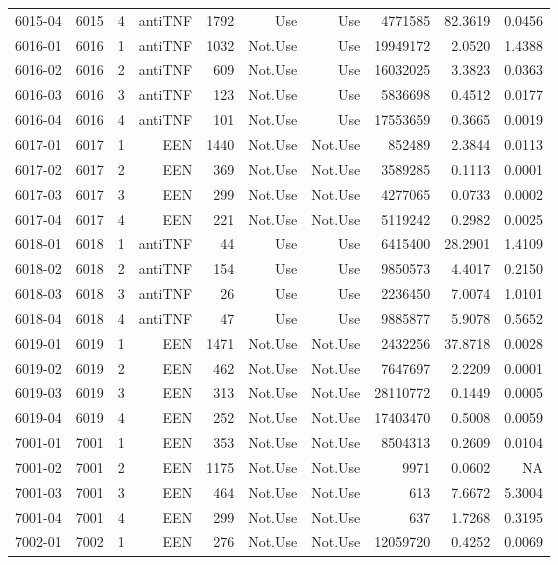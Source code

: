{\begin{longtable}{ | r | r | r | r | r | r | r | r | r | r | }
6015-04 & 6015 & 4 & antiTNF & 1792 & Use & Use & 4771585 & 82.3619 & 0.0456\\ 
6016-01 & 6016 & 1 & antiTNF & 1032 & Not.Use & Use & 19949172 & 2.0520 & 1.4388\\ 
6016-02 & 6016 & 2 & antiTNF & 609 & Not.Use & Use & 16032025 & 3.3823 & 0.0363\\ 
6016-03 & 6016 & 3 & antiTNF & 123 & Not.Use & Use & 5836698 & 0.4512 & 0.0177\\ 
6016-04 & 6016 & 4 & antiTNF & 101 & Not.Use & Use & 17553659 & 0.3665 & 0.0019\\ 
6017-01 & 6017 & 1 & EEN & 1440 & Not.Use & Not.Use & 852489 & 2.3844 & 0.0113\\ 
6017-02 & 6017 & 2 & EEN & 369 & Not.Use & Not.Use & 3589285 & 0.1113 & 0.0001\\ 
6017-03 & 6017 & 3 & EEN & 299 & Not.Use & Not.Use & 4277065 & 0.0733 & 0.0002\\ 
6017-04 & 6017 & 4 & EEN & 221 & Not.Use & Not.Use & 5119242 & 0.2982 & 0.0025\\ 
6018-01 & 6018 & 1 & antiTNF & 44 & Use & Use & 6415400 & 28.2901 & 1.4109\\ 
6018-02 & 6018 & 2 & antiTNF & 154 & Use & Use & 9850573 & 4.4017 & 0.2150\\ 
6018-03 & 6018 & 3 & antiTNF & 26 & Use & Use & 2236450 & 7.0074 & 1.0101\\ 
6018-04 & 6018 & 4 & antiTNF & 47 & Use & Use & 9885877 & 5.9078 & 0.5652\\ 
6019-01 & 6019 & 1 & EEN & 1471 & Not.Use & Not.Use & 2432256 & 37.8718 & 0.0028\\ 
6019-02 & 6019 & 2 & EEN & 462 & Not.Use & Not.Use & 7647697 & 2.2209 & 0.0001\\ 
6019-03 & 6019 & 3 & EEN & 313 & Not.Use & Not.Use & 28110772 & 0.1449 & 0.0005\\ 
6019-04 & 6019 & 4 & EEN & 252 & Not.Use & Not.Use & 17403470 & 0.5008 & 0.0059\\ 
7001-01 & 7001 & 1 & EEN & 353 & Not.Use & Not.Use & 8504313 & 0.2609 & 0.0104\\ 
7001-02 & 7001 & 2 & EEN & 1175 & Not.Use & Not.Use & 9971 & 0.0602 & NA\\ 
7001-03 & 7001 & 3 & EEN & 464 & Not.Use & Not.Use & 613 & 7.6672 & 5.3004\\ 
7001-04 & 7001 & 4 & EEN & 299 & Not.Use & Not.Use & 637 & 1.7268 & 0.3195\\ 
7002-01 & 7002 & 1 & EEN & 276 & Not.Use & Not.Use & 12059720 & 0.4252 & 0.0069\\ 

\end{longtable}}
